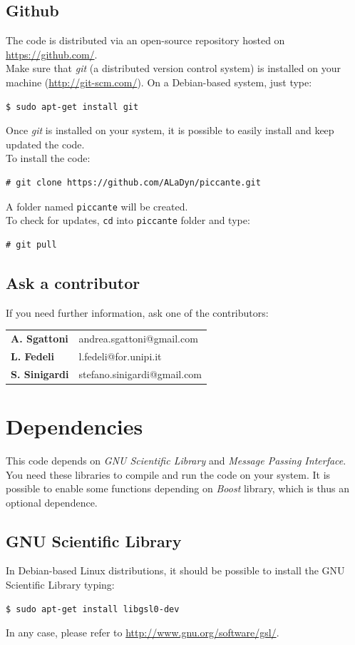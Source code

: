 \documentclass[11pt,a4paper]{report}
\begin{document}
\subsection{Github}  
The code is distributed via an open-source repository hosted on \url{https://github.com/}.\\
Make sure that \emph{git} (a distributed version control system) is installed on your machine (\url{http://git-scm.com/}).
On a Debian-based system, just type:
\begin{verbatim}
$ sudo apt-get install git
\end{verbatim}
Once \emph{git} is installed on your system, it is possible to easily install and keep updated the code.\\
To install the code:
\begin{verbatim}
# git clone https://github.com/ALaDyn/piccante.git
\end{verbatim}
A folder named \verb+piccante+ will be created.\\
To check for updates, \verb+cd+ into \verb+piccante+ folder and type:
\begin{verbatim}
# git pull
\end{verbatim}

\subsection{Ask a contributor}
If you need further information, ask one of the contributors:
\begin{center}
    \begin{tabular}{ l | l }
    	\textbf{A. Sgattoni} & andrea.sgattoni@gmail.com\\
    	\textbf{L. Fedeli} & l.fedeli@for.unipi.it  \\
    	\textbf{S. Sinigardi} & stefano.sinigardi@gmail.com 
    \end{tabular}
\end{center}

\section{Dependencies}
This code depends on \emph{GNU Scientific Library} and \emph{Message Passing Interface}. You need these libraries to compile and run the code on your system. It is possible to enable some functions depending on \emph{Boost} library, which is thus an optional dependence.
\subsection{GNU Scientific Library}
In Debian-based Linux distributions, it should be possible to install the GNU Scientific Library typing:
\begin{verbatim}
$ sudo apt-get install libgsl0-dev
\end{verbatim}
In any case, please refer to \url{http://www.gnu.org/software/gsl/}.
\end{document}
